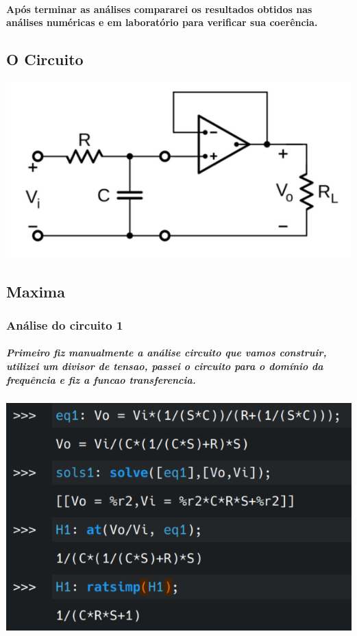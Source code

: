 \documentclass[12pt,twoside, a4paper, twocolumn]{article}
\begin{document}
\paragraph*{Após terminar as análises compararei os resultados obtidos nas análises numéricas e em laboratório para verificar sua coerência.}








\subsection{O Circuito}
\begin{adjustbox}{scale=0.6}
    \includegraphics{AnaliseNodal.png}
\end{adjustbox}
\newpage
\subsection{Maxima}




\subsubsection{Análise do circuito 1}



\subparagraph*{Primeiro fiz manualmente a análise circuito que vamos construir, utilizei um divisor de tensao, passei o circuito para o domínio da frequência e fiz a funcao transferencia.}
\subparagraph*{}

\begin{adjustbox}{scale=0.4}
    \includegraphics{eqs1.png}
\end{adjustbox}
\end{document}
